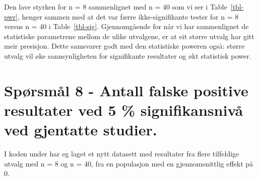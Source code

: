 \documentclass[
  letterpaper,
  DIV=11,
  numbers=noendperiod]{scrreprt}
\begin{document}
Den lave styrken for n = 8 sammenlignet med n = 40 som vi ser i
Table~\ref{tbl-pwr}, henger sammen med at det var færre
ikke-signifikante tester for n = 8 versus n = 40 i Table~\ref{tbl-sig}.
Gjennomgående for når vi har sammenlignet de statistiske parametrene
mellom de ulike utvalgene, er at eit større utvalg har gitt meir
presisjon. Dette samsvarer godt med den statistiske poweren også: større
utvalg vil øke sannsynligheten for signifikante resultater og økt
statistisk power.

\section{Spørsmål 8 - Antall falske positive resultater ved 5 \%
signifikansnivå ved gjentatte
studier.}\label{spuxf8rsmuxe5l-8---antall-falske-positive-resultater-ved-5-signifikansnivuxe5-ved-gjentatte-studier.}

I koden under har eg laget et nytt datasett med resultater fra flere
tilfeldige utvalg med n = 8 og n = 40, fra en populasjon med en
gjennomsnittlig effekt på 0.
\end{document}
